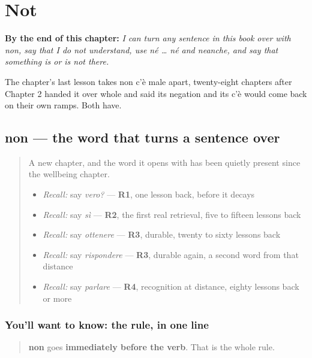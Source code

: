 
\chapter{Not}
\label{ch:it-non}

\begin{chapteropening}
\textbf{By the end of this chapter:} \emph{I can turn any sentence in this book over with non, say that I do not understand, use né … né and neanche, and say that something is or is not there.}

The chapter's last lesson takes non c'è male apart, twenty-eight chapters after Chapter 2 handed it over whole and said its negation and its c'è would come back on their own ramps. Both have.
\end{chapteropening}

\section[non]{non — the word that turns a sentence over}

\label{lesson:IT-C30-non}



\begin{quote}
A new chapter, and the word it opens with has been quietly present since the wellbeing chapter.

\begin{itemize}
\raggedright
  \item \emph{Recall:} say \emph{vero?} — \textbf{R1}, one lesson back, before it decays
  \item \emph{Recall:} say \emph{sì} — \textbf{R2}, the first real retrieval, five to fifteen lessons back
  \item \emph{Recall:} say \emph{ottenere} — \textbf{R3}, durable, twenty to sixty lessons back
  \item \emph{Recall:} say \emph{rispondere} — \textbf{R3}, durable again, a second word from that distance
  \item \emph{Recall:} say \emph{parlare} — \textbf{R4}, recognition at distance, eighty lessons back or more
\end{itemize}
\end{quote}

\subsection*{You'll want to know: the rule, in one line}
\begin{quote}
\textbf{non} goes \textbf{immediately before the verb}. That is the whole rule.
\end{quote}


